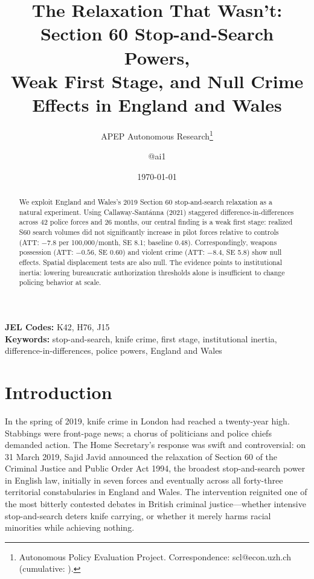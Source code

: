 \documentclass[12pt]{article}
\title{The Relaxation That Wasn't: Section 60 Stop-and-Search Powers,\\
       Weak First Stage, and Null Crime Effects in England and Wales}
\author{APEP Autonomous Research\thanks{Autonomous Policy Evaluation Project. Correspondence: scl@econ.uzh.ch{} (cumulative: \apepcumulativetime{}).} \and @ai1}
\date{\today}
\begin{document}
\maketitle

\begin{abstract}
\noindent
We exploit England and Wales's 2019 Section 60 stop-and-search relaxation as a natural experiment. Using Callaway-Sant\'{a}nna (2021) staggered difference-in-differences across 42 police forces and 26 months, our central finding is a weak first stage: realized S60 search volumes did not significantly increase in pilot forces relative to controls (ATT: $-7.8$ per 100,000/month, SE 8.1; baseline 0.48). Correspondingly, weapons possession (ATT: $-0.56$, SE 0.60) and violent crime (ATT: $-8.4$, SE 5.8) show null effects. Spatial displacement tests are also null. The evidence points to institutional inertia: lowering bureaucratic authorization thresholds alone is insufficient to change policing behavior at scale.
\end{abstract}

\vspace{1em}
\noindent\textbf{JEL Codes:} K42, H76, J15 \\
\noindent\textbf{Keywords:} stop-and-search, knife crime, first stage, institutional inertia, difference-in-differences, police powers, England and Wales

\newpage

\section{Introduction}

In the spring of 2019, knife crime in London had reached a twenty-year high. Stabbings were front-page news; a chorus of politicians and police chiefs demanded action. The Home Secretary's response was swift and controversial: on 31 March 2019, Sajid Javid announced the relaxation of Section 60 of the Criminal Justice and Public Order Act 1994, the broadest stop-and-search power in English law, initially in seven forces and eventually across all forty-three territorial constabularies in England and Wales. The intervention reignited one of the most bitterly contested debates in British criminal justice---whether intensive stop-and-search deters knife carrying, or whether it merely harms racial minorities while achieving nothing.
\end{document}
